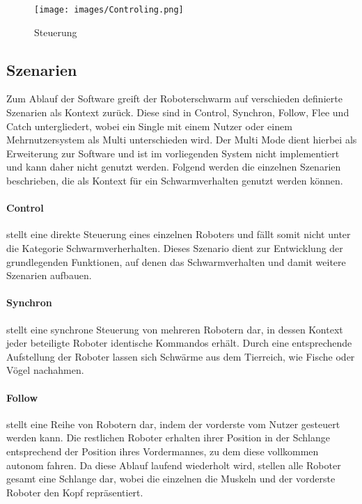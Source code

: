 \begin{figure}[h]
	\centering
	\texttt{[image: images/Controling.png]}
	\caption{Steuerung}
	\label{fig:steuerung}
\end{figure}

\subsection{Szenarien}

Zum Ablauf der Software greift der Roboterschwarm auf verschieden definierte Szenarien als Kontext zurück. Diese sind in Control, Synchron, Follow, Flee und Catch untergliedert, wobei ein Single mit einem Nutzer oder einem Mehrnutzersystem als Multi unterschieden wird. Der Multi Mode dient hierbei als Erweiterung zur Software und ist im vorliegenden System nicht implementiert und kann daher nicht genutzt werden. Folgend werden die einzelnen Szenarien beschrieben, die als Kontext für ein Schwarmverhalten genutzt werden können.

\paragraph{Control}

stellt eine direkte Steuerung eines einzelnen Roboters und fällt somit nicht unter die Kategorie Schwarmverherhalten. Dieses Szenario dient zur Entwicklung der grundlegenden Funktionen, auf denen das Schwarmverhalten und damit weitere Szenarien aufbauen.

\paragraph{Synchron}

stellt eine synchrone Steuerung von mehreren Robotern dar, in dessen Kontext jeder beteiligte Roboter identische Kommandos erhält. Durch eine entsprechende Aufstellung der Roboter lassen sich Schwärme aus dem Tierreich, wie Fische oder Vögel nachahmen.

\paragraph{Follow}

stellt eine Reihe von Robotern dar, indem der vorderste vom Nutzer gesteuert werden kann. Die restlichen Roboter erhalten ihrer Position in der Schlange entsprechend der Position ihres Vordermannes, zu dem diese vollkommen autonom fahren. Da diese Ablauf laufend wiederholt wird, stellen alle Roboter gesamt eine Schlange dar, wobei die einzelnen die Muskeln und der vorderste Roboter den Kopf repräsentiert.

